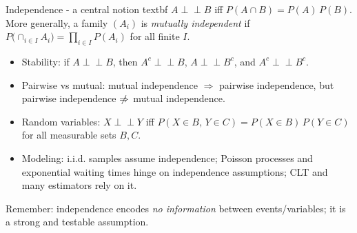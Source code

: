 \documentclass[aspectratio=43]{beamer}
\def\textemdash{-}%
\def\P{P}%
\def\mathbb#1{#1}%
\renewcommand{\P}{\mathbb{P}}
\newcommand{\1}{\mathbf{1}}
\newcommand{\indep}{\perp\!\!\!\perp}
\newcommand{\robustcmd}[1]{\csname #1\endcsname}
\providecommand{\textbf}[1]{\robustcmd{textbf}{#1}}
\begin{document}
\begin{frame}{Independence \textemdash{} a central notion}
  	\textbf{Events.} $A\indep B$ iff $\P(A\cap B)=\P(A)\,\P(B)$. More generally, a family $(A_i)$ is \emph{mutually independent} if $\P\!\big(\cap_{i\in I} A_i\big)=\prod_{i\in I}\P(A_i)$ for all finite $I$.
  \begin{itemize}
    \setlength{\itemsep}{0.35em}
    \item Stability: if $A\indep B$, then $A^c\indep B$, $A\indep B^c$, and $A^c\indep B^c$.
    \item Pairwise vs mutual: mutual independence $\Rightarrow$ pairwise independence, but pairwise independence $\centernot\Rightarrow$ mutual independence.
    \item Random variables: $X\indep Y$ iff $\P(X\in B,\,Y\in C)=\P(X\in B)\,\P(Y\in C)$ for all measurable sets $B,C$.
    \item Modeling: i.i.d. samples assume independence; Poisson processes and exponential waiting times hinge on independence assumptions; CLT and many estimators rely on it.
  \end{itemize}
  {\small Remember: independence encodes \emph{no information} between events/variables; it is a strong and testable assumption.}
\end{frame}
\end{document}
